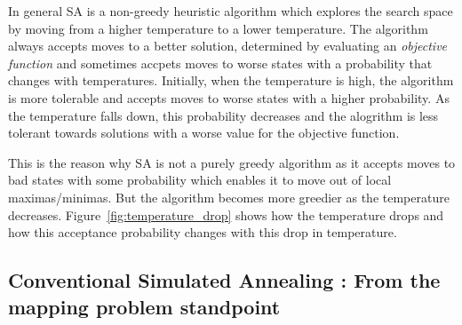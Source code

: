 In general SA is a non-greedy heuristic algorithm which explores the search
space by moving from a higher temperature to a lower temperature. The algorithm
always accepts moves to a better solution, determined by evaluating an
\textit{objective function} and sometimes accpets moves to worse states with a
probability that changes with temperatures. Initially, when the temperature is
high, the algorithm is more tolerable and accepts moves to worse states with a
higher probability. As the temperature falls down, this probability decreases
and the alogrithm is less tolerant towards solutions with a worse value for the
objective function.

This is the reason why SA is not a purely greedy algorithm as it accepts moves
to bad states with some probability which enables it to move out of local
maximas/minimas. But the algorithm becomes more greedier as the temperature
decreases. Figure~\ref{fig:temperature_drop} shows how the temperature drops and
how this acceptance probability changes with this drop in temperature.

\subsection{Conventional Simulated Annealing : From the mapping problem standpoint}

